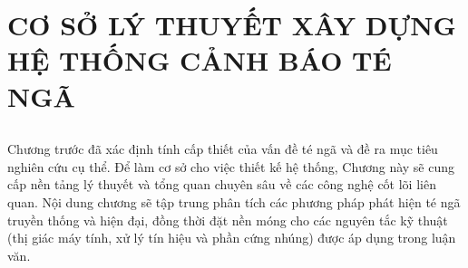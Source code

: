 \chapter{CƠ SỞ LÝ THUYẾT XÂY DỰNG HỆ THỐNG CẢNH BÁO TÉ NGÃ} 
\label{chap:theoretical_basis} %

\section*{} %
Chương trước đã xác định tính cấp thiết của vấn đề té ngã và đề ra mục tiêu nghiên cứu cụ thể. Để làm cơ sở cho việc thiết kế hệ thống, Chương này sẽ cung cấp nền tảng lý thuyết và tổng quan chuyên sâu về các công nghệ cốt lõi liên quan. Nội dung chương sẽ tập trung phân tích các phương pháp phát hiện té ngã truyền thống và hiện đại, đồng thời đặt nền móng cho các nguyên tắc kỹ thuật (thị giác máy tính, xử lý tín hiệu và phần cứng nhúng) được áp dụng trong luận văn.







